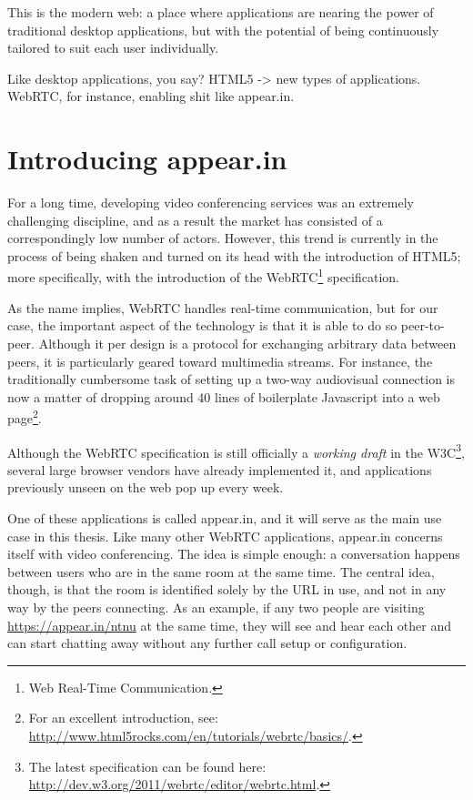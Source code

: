 This is the modern web: a place where applications are nearing the power of traditional desktop applications, but with the potential of being continuously tailored to suit each user individually.

Like desktop applications, you say? HTML5 -> new types of applications. WebRTC, for instance, enabling shit like appear.in.

\section{Introducing appear.in}
\label{sec:appearin_intro}

For a long time, developing video conferencing services was an extremely challenging discipline, and as a result the market has consisted of a correspondingly low number of actors. However, this trend is currently in the process of being shaken and turned on its head with the introduction of HTML5; more specifically, with the introduction of the WebRTC\footnote{Web Real-Time Communication.} specification.

As the name implies, WebRTC handles real-time communication, but for our case, the important aspect of the technology is that it is able to do so peer-to-peer. Although it per design is a protocol for exchanging arbitrary data between peers, it is particularly geared toward multimedia streams. For instance, the traditionally cumbersome task of setting up a two-way audiovisual connection is now a matter of dropping around 40 lines of boilerplate Javascript into a web page\footnote{For an excellent introduction, see: \url{http://www.html5rocks.com/en/tutorials/webrtc/basics/}.}.

Although the WebRTC specification is still officially a \emph{working draft} in the W3C\footnote{The latest specification can be found here: \url{http://dev.w3.org/2011/webrtc/editor/webrtc.html}.}, several large browser vendors have already implemented it, and applications previously unseen on the web pop up every week.

One of these applications is called appear.in, and it will serve as the main use case in this thesis. Like many other WebRTC applications, appear.in concerns itself with video conferencing. The idea is simple enough: a conversation happens between users who are in the same room at the same time. The central idea, though, is that the room is identified solely by the URL in use, and not in any way by the peers connecting. As an example, if any two people are visiting \url{https://appear.in/ntnu} at the same time, they will see and hear each other and can start chatting away without any further call setup or configuration.

